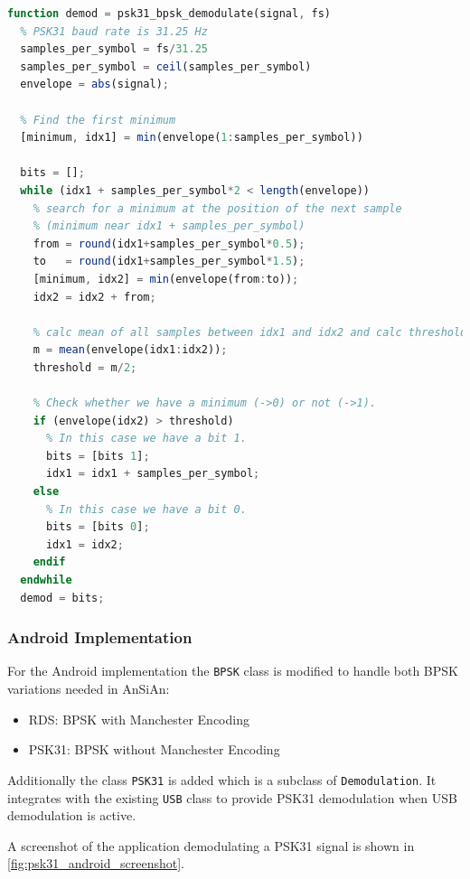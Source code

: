 \begin{lstlisting}[label=lst:octave_psk31_bpsk, caption=Octave implementation of the BPSK demodulation, language=octave]
function demod = psk31_bpsk_demodulate(signal, fs)
  % PSK31 baud rate is 31.25 Hz
  samples_per_symbol = fs/31.25
  samples_per_symbol = ceil(samples_per_symbol)
  envelope = abs(signal);
  
  % Find the first minimum
  [minimum, idx1] = min(envelope(1:samples_per_symbol))
  
  bits = [];
  while (idx1 + samples_per_symbol*2 < length(envelope))
    % search for a minimum at the position of the next sample
    % (minimum near idx1 + samples_per_symbol)
    from = round(idx1+samples_per_symbol*0.5);
    to   = round(idx1+samples_per_symbol*1.5);
    [minimum, idx2] = min(envelope(from:to));
    idx2 = idx2 + from;
    
    % calc mean of all samples between idx1 and idx2 and calc threshold = mean/2
    m = mean(envelope(idx1:idx2));
    threshold = m/2;
    
    % Check whether we have a minimum (->0) or not (->1).
    if (envelope(idx2) > threshold)
      % In this case we have a bit 1.
      bits = [bits 1];
      idx1 = idx1 + samples_per_symbol;
    else
      % In this case we have a bit 0.
      bits = [bits 0];
      idx1 = idx2;
    endif
  endwhile
  demod = bits;
\end{lstlisting}

\subsubsection{Android Implementation}

For the Android implementation the \texttt{BPSK} class is modified to handle both
\ac{BPSK} variations needed in \ac{AnSiAn}:
\begin{itemize}
	\item RDS: BPSK with Manchester Encoding
	\item PSK31: BPSK without Manchester Encoding
\end{itemize}

Additionally the class \texttt{PSK31} is added which is a subclass of \texttt{Demodulation}.
It integrates with the existing \texttt{USB} class to provide PSK31 demodulation
when USB demodulation is active.

A screenshot of the application demodulating a \ac{PSK31} signal is shown in 
\autoref{fig:psk31_android_screenshot}.

